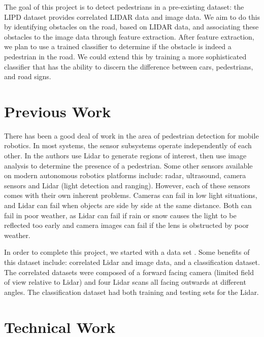 \documentclass[10pt,twocolumn,letterpaper]{article}
\begin{document}
  The goal of this project is to detect pedestrians in a pre-existing dataset:
  the LIPD dataset provides correlated LIDAR data and image data. We aim to do
  this by identifying obstacles on the road, based on LIDAR data, and
  associating these obstacles to the image data through feature extraction.
  After feature extraction, we plan to use a trained classifier to determine
  if the obstacle is indeed a pedestrian in the road. We could extend this by
  training a more sophisticated classifier that has the ability to discern the
  difference between cars, pedestrians, and road signs.

\section{Previous Work}

  There has been a good deal of work in the area of pedestrian detection for
  mobile robotics. In most systems, the sensor subsystems operate independently
  of each other. In \cite{journal} the authors use Lidar to generate regions
  of interest, then use image analysis to determine the presence of a
  pedestrian. Some other sensors available on modern autonomous robotics
  platforms include: radar, ultrasound, camera sensors and Lidar (light
  detection and ranging). However, each of these sensors comes with their own
  inherent problems. Cameras can fail in low light situations, and Lidar can
  fail when objects are side by side at the same distance. Both can fail in poor
  weather, as Lidar can fail if rain or snow causes the light to be reflected
  too early and camera images can fail if the lens is obstructed by poor weather.

  In order to complete this project, we started with a data set \cite{dataset}.
  Some benefits of this dataset include: correlated Lidar and image data, and
  a classification dataset. The correlated datasets were composed of a forward
  facing camera (limited field of view relative to Lidar) and four Lidar scans
  all facing outwards at different angles. The classification dataset had both
  training and testing sets for the Lidar.


\section{Technical Work}
\end{document}
